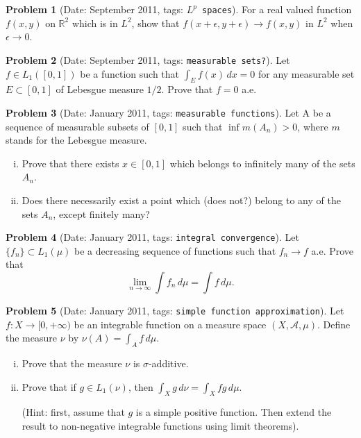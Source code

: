 \documentclass[11pt, notitlepage]{article}
\theoremstyle{definition}
\theoremstyle{definition}
\theoremstyle{definition}
\newtheorem{probstate}{Problem}
\theoremstyle{remark}
\newenvironment{problem}[2]{
    \begin{probstate}[Date: #1, tags: \texttt{#2}]
}
{
  \end{probstate}
}
\begin{document}
\begin{problem}{September 2011}{$L^p$ spaces}
  For a real valued function $f(x,y)$ on $\mathbb R^2$ which is in $L^2$, show that $f(x+\epsilon,y+\epsilon) \rightarrow f(x,y)$ in $L^2$ when $\epsilon \rightarrow 0$.
\end{problem}


\begin{problem}{September 2011}{measurable sets?}
  Let $f \in L_1([0,1])$ be a function such that $\int_E f (x) \, dx=0$ for any measurable set $E \subset [0,1]$ of Lebesgue measure $1/2$.
  Prove that $f=0$ a.e.
\end{problem}

\begin{problem}{January 2011}{measurable functions}
  \item Let A be a sequence of measurable subsets of $[0,1]$ such that $\inf m(A_n)>0$, where $m$ stands for the Lebesgue measure.
   \begin{enumerate}[(i)]
    \item Prove that there exists $x \in [0,1]$ which belongs to infinitely many of the sets $A_n$.
    \item Does there necessarily exist a point which {\color{red} (does not?)} belong to any of the sets $A_n$, except finitely many?
   \end{enumerate}
\end{problem}

\begin{problem}{January 2011}{integral convergence}
  Let $\{f_n\} \subset L_1(\mu)$ be a decreasing sequence of functions such that $f_n \to f$ a.e.
  Prove that
    \[
      \lim_{n \to \infty} \int f_n \, d \mu = \int f \, d \mu.
    \]
\end{problem}

\begin{problem}{January 2011}{simple function approximation}
  Let $f:X \to [0, +\infty)$ be an integrable function on
    a measure space $(X, \mathcal{A},\mu)$.
    Define the measure $\nu$ by $\nu(A)=\int_A f \, d \mu$.
    \begin{enumerate}[(i)]
        \item Prove that the measure $\nu$ is $\sigma$-additive.

        \item Prove that if
        $g \in L_1(\nu)$, then
        $\int_X g \, d \nu =\int_X fg \, d \mu$.

        (Hint: first, assume that $g$ is a simple positive
        function. Then extend the result to non-negative
        integrable functions using limit theorems).
    \end{enumerate}
\end{problem}
\end{document}
